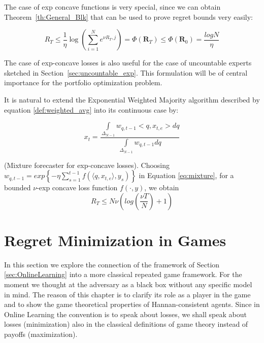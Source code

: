 The case of exp concave functions is very special, since we can obtain Theorem~\ref{th:General_Blk} that can be used to prove regret bounds very easily:

\begin{equation}\label{eq:regret_exp_finite}
    R_T\le \frac{1}{\eta}\log\left(\sum\limits_{i=1}^N e^{\nu R_T,j}\right)=\Phi(\mathbf R_T)\le\Phi(\mathbf R_0) = \frac{log N}{\eta}
\end{equation}

The case of exp-concave losses is also useful for the case of uncountable experts sketched in Section~\ref{sec:uncountable_exp}. This formulation will be of central importance for the portfolio optimization problem.

It is natural to extend the Exponential Weighted Majority algorithm described by equation \eqref{def:weighted_avg} into its continuous case by:

\begin{equation}\label{eq:mixture}
    x_t=\frac{\int\limits_{\Delta_{N-1}} w_{q,t-1}<q,x_{t,e}>dq}{\int\limits_{\Delta_{N-1}} w_{q,t-1}dq}
\end{equation}

\begin{theorem}(Mixture forecaster for exp-concave losses).
    Choosing $w_{q,t-1}=exp\left\{-\eta\sum\limits_{s=1}^{t-1}f(\langle q,x_{t,e}\rangle,y_s)\right\}$ in Equation \eqref{eq:mixture}, for a bounded $\nu$-exp concave loss function $f(\cdot,y)$, we obtain
    $$R_T\le N\nu\left(log\left(\frac{\nu T}{N}\right)+1\right)$$
\end{theorem}

\section{Regret Minimization in Games}
\label{sec:GT}
In this section we explore the connection of the framework of Section \ref{sec:OnlineLearning} into a more classical repeated game framework. For the moment we thought at the adversary as a black box without any specific model in mind. The reason of this chapter is to clarify its role as a player in the game and to show the game theoretical properties of Hannan-consistent agents. Since in Online Learning the convention is to speak about losses, we shall speak about losses (minimization) also in the classical definitions of game theory instead of payoffs (maximization).

